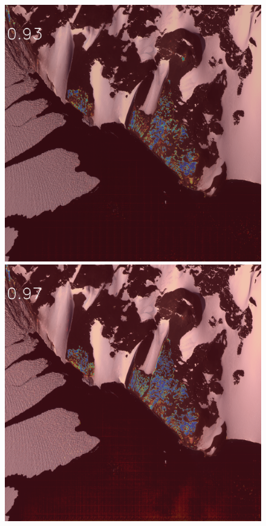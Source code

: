 \documentclass[runningheads]{llncs}
\begin{document}
\begin{figure}[h]
\includegraphics[width=\subFigx]{./fig/datagrow/MSE_single_unet_train_0_1.txt_bias-1_bs128_do0.1e25/WV02_20110131195115_1030010009CCF900_11JAN31195115-M1BS-052549143040_01_P003_u08rf3031.png}
\includegraphics[width=\subFigx]{./fig/datagrow/MSE_single_unet_train_0_2.txt_bias-1_bs128_do0.1e25/WV02_20110131195115_1030010009CCF900_11JAN31195115-M1BS-052549143040_01_P003_u08rf3031.png}

\end{figure}
\end{document}
